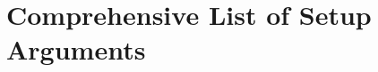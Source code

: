 \section{Comprehensive List of Setup Arguments} \label{Sec:ListSetupArgs}



\newcommand{\tabopt}[1]{\multicolumn{2}{l}{#1}\\*[1ex]}
\newcommand{\tr}{\\[1ex]}


